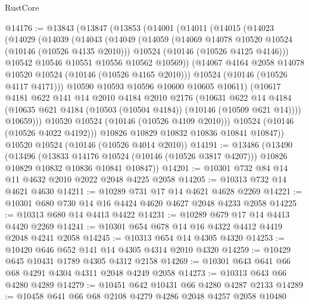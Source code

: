 \begin{lexlean}{RustCore}
\begin{coremodule}
@14176 := @13843
    (@13847
      (@13853
        (@14001
          (@14011
            (@14015
              (@14023
                (@14029
                  (@14039
                    (@14043
                      (@14049
                        (@14059
                          (@14069 @14078 @10520 @10524 (@10146 (@10526 @4135 @2010)))
                          @10524
                          (@10146 (@10526 @4125 @4146)))
                        @10542
                        @10546
                        @10551
                        @10556
                        @10562
                        @10569))
                    (@14067 @4164 @2058 @14078 @10520 @10524 (@10146 (@10526 @4165 @2010)))
                    @10524
                    (@10146 (@10526 @4117 @4171)))
                  @10590
                  @10593
                  @10596
                  @10600
                  @10605
                  @10611)
                (@10617
                  @4181
                  @622
                  @141
                  @14
                  @2010
                  @4184
                  @2010
                  @2176
                  (@10631
                    @622
                    @14
                    @4184
                    (@10635 @621 @4184 (@10503 (@10504 @4184)) (@10146 (@10509 @621 @14))))
                  @10659)))
            @10520
            @10524
            (@10146 (@10526 @4109 @2010)))
          @10524
          (@10146 (@10526 @4022 @4192)))
        @10826
        @10829
        @10832
        @10836
        @10841
        @10847))
    @10520
    @10524
    (@10146 (@10526 @4014 @2010))
@14191 := @13486
    (@13490
      (@13496
        (@13833 @14176 @10524 (@10146 (@10526 @3817 @4207)))
        @10826
        @10829
        @10832
        @10836
        @10841
        @10847))
@14201 := @10301 @732 @84 @14 @11 @4632 @2010 @2022 @2048 @4225 @2058
@14205 := @10313 @732 @14 @4621 @4630
@14211 := @10289 @731 @17 @14 @4621 @4628 @2269
@14221 := @10301 @680 @730 @14 @16 @4424 @4620 @4627 @2048 @4233 @2058
@14225 := @10313 @680 @14 @4413 @4422
@14231 := @10289 @679 @17 @14 @4413 @4420 @2269
@14241 := @10301 @654 @678 @14 @16 @4322 @4412 @4419 @2048 @4241 @2058
@14245 := @10313 @654 @14 @4305 @4320
@14253 := @10420 @646 @652 @141 @14 @4305 @4314 @2010 @4320
@14259 := @10429 @645 @10431 @1789 @4305 @4312 @2158
@14269 := @10301 @643 @641 @66 @68 @4291 @4304 @4311 @2048 @4249 @2058
@14273 := @10313 @643 @66 @4280 @4289
@14279 := @10451 @642 @10431 @66 @4280 @4287 @2133
@14289 := @10458 @641 @66 @68 @2108 @4279 @4286 @2048 @4257 @2058 @10480

\end{coremodule}
\end{lexlean}

